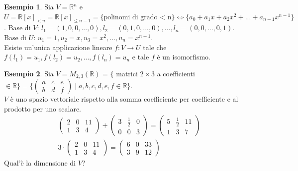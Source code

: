 \documentclass[a4paper]{article}
\theoremstyle{definition}
\newtheorem*{es}{Esempio}
\begin{document}
\begin{es}
	Sia $V = \mathbb{R}^n$ e $U = \mathbb{R}[x]_{<n} = \mathbb{R}[x]_{\leq n - 1} = \{\text{polinomi di grado < n}\} \Leftrightarrow \{a_0 + a_1x + a_2x^2 + ... + a_{n - 1}x^{n - 1}\}$.
	Base di $V$: $l_1 = (1, 0, 0, ..., 0), l_2 = (0, 1, 0, ..., 0), ..., l_n = (0, 0, ..., 0, 1)$. \\
	Base di $U$: $u_1 = 1, u_2 = x, u_3 = x^2, ..., u_n = x^{n - 1}$. \\
	Esiste un'unica applicazione lineare $f: V \rightarrow U$ tale che $f(l_1) = u_1, f(l_2) = u_2, ..., f(l_n) = u_n$ e tale $f$ è un isomorfismo.
\end{es}
\begin{es}
	Sia $V = M_{2, 3}(\mathbb{R})$ = $\{$ matrici $2 \times 3$ a coefficienti $\in \mathbb{R}\}
		= \{\begin{pmatrix} a & c & e \\ b & d & f \end{pmatrix} \mid a, b, c, d, e, f \in \mathbb{R}\}$. \\
	$V$ è uno spazio vettoriale rispetto alla somma coefficiente per coefficiente e al prodotto per uno scalare. \\
	\begin{align*}
		\begin{pmatrix}
			2 & 0 & 11 \\
			1 & 3 & 4
		\end{pmatrix} + \begin{pmatrix}
			                3 & \frac{1}{2} & 0 \\
			                0 & 0           & 3
		                \end{pmatrix} = \begin{pmatrix}
			                                5 & \frac{1}{2} & 11 \\
			                                1 & 3           & 7
		                                \end{pmatrix} \\
		3 \cdot \begin{pmatrix}
			        2 & 0 & 11 \\
			        1 & 3 & 4
		        \end{pmatrix} = \begin{pmatrix}
			                        6 & 0 & 33 \\
			                        3 & 9 & 12
		                        \end{pmatrix}
	\end{align*}
	Qual'è la dimensione di $V$? \\

\end{es}
\end{document}

